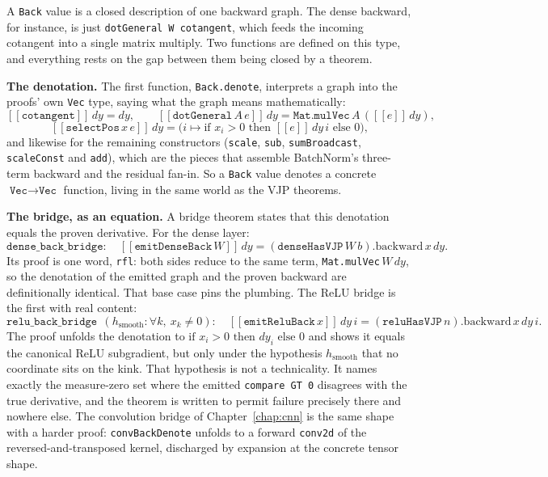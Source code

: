 \noindent A \texttt{Back} value is a closed description of one backward graph.
The dense backward, for instance, is just \texttt{dotGeneral W cotangent},
which feeds the incoming cotangent into a single matrix multiply. Two functions are
defined on this type, and everything rests on the gap between them
being closed by a theorem.

\medskip\noindent\textbf{The denotation.} The first function,
\texttt{Back.denote}, interprets a graph into the proofs' own \texttt{Vec}
type, saying what the graph means mathematically:
\[
  [\![\texttt{cotangent}]\!]\,dy = dy, \qquad
  [\![\texttt{dotGeneral}\,A\,e]\!]\,dy
    = \texttt{Mat.mulVec}\,A\,([\![e]\!]\,dy),
\]
\[
  [\![\texttt{selectPos}\,x\,e]\!]\,dy
    = \bigl(i \mapsto \text{if } x_i > 0
      \text{ then } [\![e]\!]\,dy\,i \text{ else } 0\bigr),
\]
and likewise for the remaining constructors (\texttt{scale}, \texttt{sub},
\texttt{sumBroadcast}, \texttt{scaleConst} and \texttt{add}), which are the
pieces that assemble BatchNorm's three-term backward and the residual fan-in.
So a \texttt{Back} value denotes a concrete $\texttt{Vec} \to \texttt{Vec}$
function, living in the same world as the VJP theorems.

\medskip\noindent\textbf{The bridge, as an equation.} A bridge theorem states
that this denotation equals the proven derivative. For the dense layer:
\[
  \texttt{dense\_back\_bridge}:\quad
  [\![\texttt{emitDenseBack}\,W]\!]\,dy
  = (\texttt{denseHasVJP}\,W\,b).\mathrm{backward}\,x\,dy.
\]
Its proof is one word, \texttt{rfl}: both sides reduce to the same
term, \texttt{Mat.mulVec}\,$W\,dy$, so the denotation of the emitted graph and
the proven backward are definitionally identical. That base case pins the
plumbing. The ReLU bridge is the first with real content:
\[
  \texttt{relu\_back\_bridge}\ \ (h_{\text{smooth}} : \forall k,\ x_k \ne 0):
  \quad
  [\![\texttt{emitReluBack}\,x]\!]\,dy\,i
  = (\texttt{reluHasVJP}\,n).\mathrm{backward}\,x\,dy\,i.
\]
The proof unfolds the denotation to $\text{if } x_i > 0 \text{ then } dy_i
\text{ else } 0$ and shows it equals the canonical ReLU subgradient, but
only under the hypothesis $h_{\text{smooth}}$ that no coordinate sits
on the kink. That hypothesis is not a technicality. It names exactly the
measure-zero set where the emitted \texttt{compare GT 0} disagrees with the
true derivative, and the theorem is written to permit failure precisely there
and nowhere else. The convolution bridge of Chapter~\ref{chap:cnn} is the same
shape with a harder proof: \texttt{convBackDenote} unfolds to a forward
\texttt{conv2d} of the reversed-and-transposed kernel, discharged by expansion
at the concrete tensor shape.


